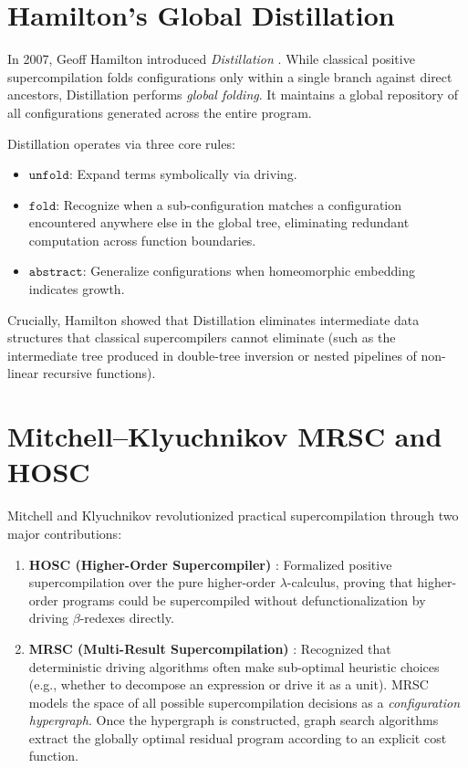 \section{Hamilton's Global Distillation}
\label{sec:background:distillation}

In 2007, Geoff Hamilton introduced \emph{Distillation} \citep{hamilton2007distillation}. While classical positive supercompilation folds configurations only within a single branch against direct ancestors, Distillation performs \emph{global folding}. It maintains a global repository of all configurations generated across the entire program. 

Distillation operates via three core rules:
\begin{itemize}
    \item $\mathtt{unfold}$: Expand terms symbolically via driving.
    \item $\mathtt{fold}$: Recognize when a sub-configuration matches a configuration encountered anywhere else in the global tree, eliminating redundant computation across function boundaries.
    \item $\mathtt{abstract}$: Generalize configurations when homeomorphic embedding indicates growth.
\end{itemize}
Crucially, Hamilton showed that Distillation eliminates intermediate data structures that classical supercompilers cannot eliminate (such as the intermediate tree produced in double-tree inversion or nested pipelines of non-linear recursive functions).

\section{Mitchell--Klyuchnikov MRSC and HOSC}
\label{sec:background:mrsc}

Mitchell and Klyuchnikov revolutionized practical supercompilation through two major contributions:
\begin{enumerate}
    \item \textbf{HOSC (Higher-Order Supercompiler)} \citep{mitchell2010hosc}: Formalized positive supercompilation over the pure higher-order $\lambda$-calculus, proving that higher-order programs could be supercompiled without defunctionalization by driving $\beta$-redexes directly.
    \item \textbf{MRSC (Multi-Result Supercompilation)} \citep{klyuchnikov2012practical}: Recognized that deterministic driving algorithms often make sub-optimal heuristic choices (e.g., whether to decompose an expression or drive it as a unit). MRSC models the space of all possible supercompilation decisions as a \emph{configuration hypergraph}. Once the hypergraph is constructed, graph search algorithms extract the globally optimal residual program according to an explicit cost function.
\end{enumerate}

